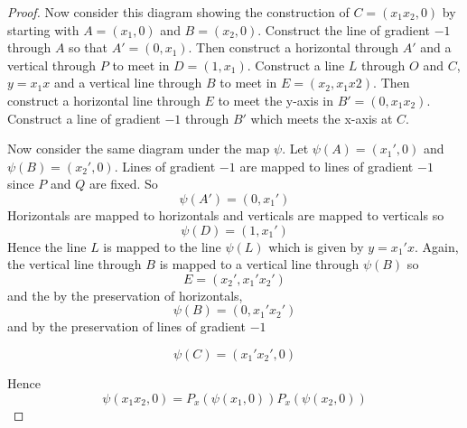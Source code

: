 \documentclass[honours]{UNSWthesis}
\newcommand{\1}{\mathbf{e}_{1}}
\newcommand{\2}{\mathbf{e}_{3}}
\newcommand{\3}{\mathbf{e}_{3}}
\begin{document}
\begin{proof}
Now consider this diagram showing the construction of $C=(x_{1}x_{2},0)$ by starting with $A=(x_{1},0)$ and $B=(x_{2},0)$. Construct the line of gradient $-1$ through $A$ so that $A'=(0,x_{1})$. Then construct a horizontal through $A'$ and a vertical through $P$ to meet in $D=(1,x_{1})$. Construct a line $L$ through $O$ and $C$, $y=x_{1}x$ and a vertical line through $B$ to meet in $E=(x_{2}, x_{1}x{2})$. Then construct a horizontal line through $E$ to meet the y-axis in $B'=(0,x_{1}x_{2})$. Construct a line of gradient $-1$ through $B'$ which meets the x-axis at $C$. 

Now consider the same diagram under the map $\psi$. Let $\psi(A)=(x_{1}',0)$ and $\psi(B)=(x_{2}',0) $. Lines of gradient $-1$ are mapped to lines of gradient $-1$ since $P$ and $Q$ are fixed. So 
\[
\psi(A')=(0,x_{1}')
\]
Horizontals are mapped to horizontals and verticals are mapped to verticals so
\[
\psi(D)=(1,x_{1}')
\]
Hence the line $L$ is mapped to the line $\psi(L)$ which is given by $y=x_{1}'x$. Again, the vertical line through $B$ is mapped to a vertical line through $\psi(B)$ so 
\[
E=(x_{2}',x_{1}'x_{2}')
\]
and the by the preservation of horizontals, 
\[
\psi(B)=(0,x_{1}'x_{2}')
\]
and by the preservation of lines of gradient $-1$


\[
\psi(C)=(x_{1}'x_{2}',0)
\]

Hence 
\begin{equation*}
\psi(x_{1}x_{2},0)=P_{x}(\psi(x_{1},0))P_{x}(\psi(x_{2},0))
\end{equation*}


\end{proof}
\end{document}
